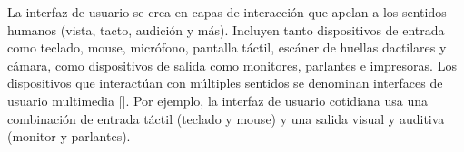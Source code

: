 La interfaz de usuario se crea en capas de interacción que apelan a los sentidos humanos (vista, tacto, audición y más). Incluyen tanto dispositivos de entrada como teclado, mouse, micrófono, pantalla táctil, escáner de huellas dactilares y cámara, como dispositivos de salida como monitores, parlantes e impresoras. Los dispositivos que interactúan con múltiples sentidos se denominan interfaces de usuario multimedia [\cite{24}]. Por ejemplo, la interfaz de usuario cotidiana usa una combinación de entrada táctil (teclado y mouse) y una salida visual y auditiva (monitor y parlantes).



%


